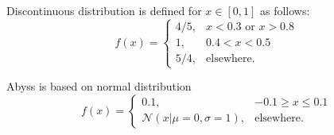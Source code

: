 \documentclass{article}
\begin{document}
Discontinuous distribution is defined for $x \in [0, 1]$ as follows:
\begin{equation}
    f(x)=
    \begin{cases}
      4/5, & x < 0.3 \text{ or } x > 0.8 \\
      1, & 0.4 < x < 0.5 \\
      5/4, & \text{elsewhere.}
    \end{cases}
 \end{equation}
  
Abyss is based on normal distribution
  \begin{equation}
    f(x)=
    \begin{cases}
      0.1, & -0.1 \geq x \leq 0.1 \\   
      \mathcal{N}(x|\mu=0, \sigma=1), & \text{elsewhere.}
    \end{cases}
 \end{equation}
  
\end{document}
